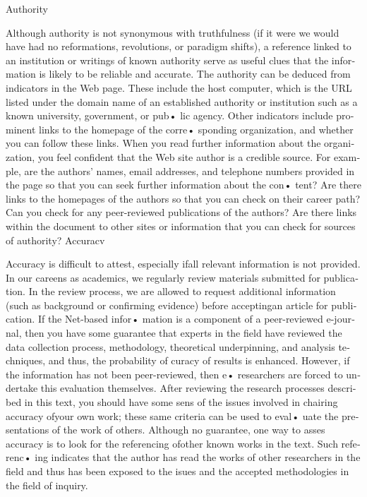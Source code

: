 \documentclass[a4 paper,12pt]{article}\usepackage{xepersian}
\begin{document}
\begin{latin}
\vspace{0.1cm}

\noindent
Authority\\
\vspace{0.1cm}
\vspace{0.1cm}

\noindent
Although authority is not synonymous with truthfulness (if it were we would have had no reformations, revolutions,  or paradigm shifts), a  reference  linked to an institution or writings of known authority serve as useful clues that the information is likely to be reliable and accurate. The authority can be deduced from indicators in the Web page. These include the host computer, which is the URL listed under the domain name of an established authority or institution such as a known university, government, or pub• lic agency.  Other indicators include prominent links to the homepage of the corre• sponding organization, and whether you can follow  these links. When you read further information about the organization, you feel confident that the Web site author is a credible source.  For example,  are the authors' names, email addresses, and telephone numbers provided in the page so that you can seek further information about the con• tent?  Are there links to the homepages of the authors so that you can check on their career path? Can you check for any peer-reviewed publications of the authors? Are there links within the document to other sites or information  that  you can check for sources of authority?
\noindent
Accuracv\\
\vspace{0.1cm}
\vspace{0.1cm}

\noindent
Accuracy is difficult to attest, especially ifall relevant information is            not provided. In our careens as academics, we regularly review materials submitted for publication.  In the review  process, we are allowed  to request additional information (such  as background or confirming evidence) before acceptingan article for publication.  If the Net-based infor• mation is a component of a  peer-reviewed e-journal, then you have some guarantee that experts  in the  field have reviewed  the data collection process, methodology, theoretical underpinning, and analysis techniques, and thus, the probability of  curacy of results is  enhanced.  However,  if the  information  has not  been  peer-reviewed,   then  e• researchers are forced to undertake this evaluation themselves. After reviewing the research processes  described  in  this text,  you should  have  some  sens  of the issues involved in chairing accuracy ofyour own work; these same criteria can be used  to eval• uate the presentations of the work of others.  Although no guarantee, one way  to asses accuracy is        to look for the referencing ofother known works in the text. Such referenc•
ing indicates  that the author has read the works of other researchers in the field and thus
has been exposed to the isues and the accepted  methodologies in the field of inquiry.


\end{latin}
\end{document}
